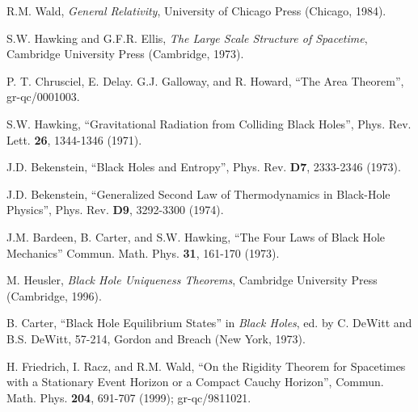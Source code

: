 \begin{thebibliography}{999}

 R.M. Wald, {\it General Relativity},
University of Chicago Press (Chicago, 1984).

 S.W. Hawking and G.F.R. Ellis, {\it The
Large Scale Structure of Spacetime}, Cambridge University Press
(Cambridge, 1973).

 P. T. Chrusciel,
E. Delay. G.J. Galloway, and R. Howard, ``The Area Theorem'',
gr-qc/0001003.  

 S.W. Hawking, ``Gravitational Radiation
from Colliding Black Holes'', Phys. Rev. Lett. {\bf 26}, 1344-1346 (1971).

 J.D. Bekenstein, ``Black Holes and
Entropy'', Phys. Rev. {\bf D7}, 2333-2346 (1973).  

 J.D. Bekenstein, ``Generalized Second
Law of Thermodynamics in Black-Hole Physics'', Phys. Rev. {\bf D9},
3292-3300 (1974).  

 J.M.  Bardeen, B. Carter, and
S.W. Hawking, ``The Four Laws of Black Hole Mechanics'' Commun.
Math. Phys. {\bf 31}, 161-170 (1973).  

 M. Heusler, {\it Black Hole Uniqueness
Theorems}, Cambridge University Press (Cambridge, 1996).

 B. Carter, ``Black Hole Equilibrium
States'' in {\it Black Holes}, ed. by C. DeWitt and B.S. DeWitt, 57-214,
Gordon and Breach (New York, 1973).

 H. Friedrich, I. Racz, and R.M. Wald,
``On the Rigidity Theorem for Spacetimes with a Stationary Event
Horizon or a Compact Cauchy Horizon'', Commun. Math. Phys. {\bf 204},
691-707 (1999); gr-qc/9811021.


\end{thebibliography}
